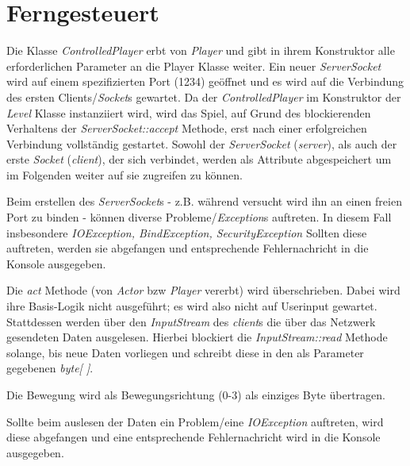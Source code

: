 \documentclass{pi1}
\begin{document}
\section{Ferngesteuert}

Die Klasse \textit{ControlledPlayer} erbt von \textit{Player} und gibt in ihrem Konstruktor alle erforderlichen Parameter an die Player Klasse weiter.
Ein neuer \textit{ServerSocket} wird auf einem spezifizierten Port (1234) geöffnet und es wird auf die Verbindung des ersten Clients/\textit{Socket}s gewartet. Da der \textit{ControlledPlayer} im Konstruktor der \textit{Level} Klasse instanziiert wird, wird das Spiel, auf Grund des blockierenden Verhaltens der \textit{ServerSocket::accept} Methode, erst nach einer erfolgreichen Verbindung vollständig gestartet. Sowohl der \textit{ServerSocket} (\textit{server}), als auch der erste \textit{Socket} (\textit{client}), der sich verbindet, werden als Attribute abgespeichert um im Folgenden weiter auf sie zugreifen zu können.

Beim erstellen des \textit{ServerSocket}s - z.B. während versucht wird ihn an einen freien Port zu binden - können diverse Probleme/\textit{Exception}s auftreten. In diesem Fall insbesondere \textit{IOException, BindException, SecurityException}
Sollten diese auftreten, werden sie abgefangen und entsprechende Fehlernachricht in die Konsole ausgegeben.


Die \textit{act} Methode (von \textit{Actor} bzw \textit{Player} vererbt) wird überschrieben. Dabei wird ihre Basis-Logik nicht ausgeführt; es wird also nicht auf Userinput gewartet.
Stattdessen werden über den \textit{InputStream} des \textit{client}s die über das Netzwerk gesendeten Daten ausgelesen. Hierbei blockiert die \textit{InputStream::read} Methode solange, bis neue Daten vorliegen und schreibt diese in den als Parameter gegebenen \textit{byte[ ]}.

Die Bewegung wird als Bewegungsrichtung (0-3) als einziges Byte übertragen.

Sollte beim auslesen der Daten ein Problem/eine \textit{IOException} auftreten, wird diese abgefangen und eine entsprechende Fehlernachricht wird in die Konsole ausgegeben. 
\end{document}
